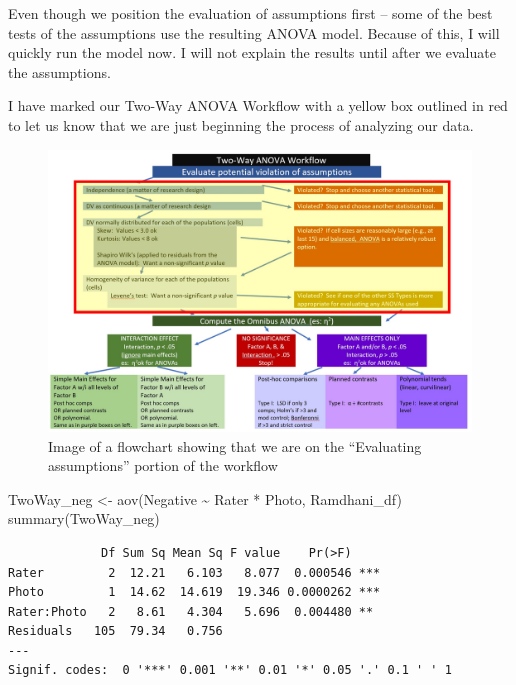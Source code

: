 \documentclass[
  11pt,
]{book}
\newenvironment{Shaded}{\begin{snugshade}}{\end{snugshade}}
\newcommand{\FunctionTok}[1]{\textcolor[rgb]{0.00,0.00,0.00}{#1}}
\newcommand{\NormalTok}[1]{#1}
\newcommand{\OtherTok}[1]{\textcolor[rgb]{0.56,0.35,0.01}{#1}}
\newcommand{\SpecialCharTok}[1]{\textcolor[rgb]{0.00,0.00,0.00}{#1}}
\begin{document}
Even though we position the evaluation of assumptions first -- some of the best tests of the assumptions use the resulting ANOVA model. Because of this, I will quickly run the model now. I will not explain the results until after we evaluate the assumptions.

I have marked our Two-Way ANOVA Workflow with a yellow box outlined in red to let us know that we are just beginning the process of analyzing our data.

\begin{figure}
\centering
\includegraphics{images/factorial/WrkFlw_Assumptions.jpg}
\caption{Image of a flowchart showing that we are on the ``Evaluating assumptions'' portion of the workflow}
\end{figure}

\begin{Shaded}
\begin{Highlighting}[]
\NormalTok{TwoWay\_neg }\OtherTok{\textless{}{-}} \FunctionTok{aov}\NormalTok{(Negative }\SpecialCharTok{\textasciitilde{}}\NormalTok{ Rater }\SpecialCharTok{*}\NormalTok{ Photo, Ramdhani\_df)}
\FunctionTok{summary}\NormalTok{(TwoWay\_neg)}
\end{Highlighting}
\end{Shaded}

\begin{verbatim}
             Df Sum Sq Mean Sq F value    Pr(>F)    
Rater         2  12.21   6.103   8.077  0.000546 ***
Photo         1  14.62  14.619  19.346 0.0000262 ***
Rater:Photo   2   8.61   4.304   5.696  0.004480 ** 
Residuals   105  79.34   0.756                      
---
Signif. codes:  0 '***' 0.001 '**' 0.01 '*' 0.05 '.' 0.1 ' ' 1
\end{verbatim}
\end{document}
